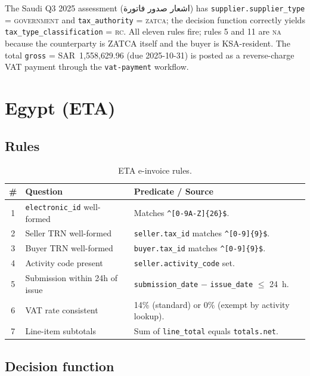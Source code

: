 \documentclass[11pt,a4paper,twoside]{report}
\newcommand{\ar}[1]{\foreignlanguage{arabic}{#1}}
\begin{document}
The Saudi Q3 2025 assessment (\ar{اشعار صدور فاتورة}) has
\texttt{supplier.supplier\_type} = \textsc{government} and
\texttt{tax\_authority} = \textsc{zatca}; the decision function
correctly yields \texttt{tax\_type\_classification} = \textsc{rc}. All
eleven rules fire; rules 5 and 11 are \textsc{na} because the
counterparty is ZATCA itself and the buyer is KSA-resident. The total
\texttt{gross} = SAR~1{,}558{,}629.96 (due 2025-10-31) is posted as a
reverse-charge VAT payment through the \texttt{vat-payment} workflow.

\section{Egypt (ETA)}

\subsection{Rules}

\begin{table}[htbp]
\centering
\caption{ETA e-invoice rules.}
\label{tab:eta-rules}
\footnotesize
\begin{tabularx}{\linewidth}{@{}c l X@{}}
\toprule
\textbf{\#} & \textbf{Question} & \textbf{Predicate / Source} \\ \midrule
1 & \texttt{electronic\_id} well-formed
& Matches \verb|^[0-9A-Z]{26}$|. \\
2 & Seller TRN well-formed   & \texttt{seller.tax\_id} matches \verb|^[0-9]{9}$|. \\
3 & Buyer TRN well-formed    & \texttt{buyer.tax\_id} matches \verb|^[0-9]{9}$|. \\
4 & Activity code present    & \texttt{seller.activity\_code} set. \\
5 & Submission within 24h of issue
& \texttt{submission\_date} $-$ \texttt{issue\_date} $\leq$ 24~h. \\
6 & VAT rate consistent      & 14\% (standard) or 0\% (exempt by activity lookup). \\
7 & Line-item subtotals      & Sum of \texttt{line\_total} equals \texttt{totals.net}. \\
\bottomrule
\end{tabularx}
\end{table}

\subsection{Decision function}
\end{document}
